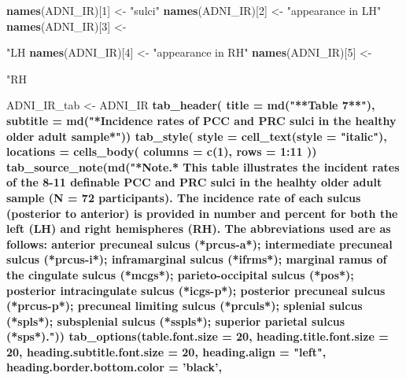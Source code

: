 \documentclass[
]{article}
\newenvironment{Shaded}{\begin{snugshade}}{\end{snugshade}}
\newcommand{\DataTypeTok}[1]{\textcolor[rgb]{0.13,0.29,0.53}{#1}}
\newcommand{\DecValTok}[1]{\textcolor[rgb]{0.00,0.00,0.81}{#1}}
\newcommand{\KeywordTok}[1]{\textcolor[rgb]{0.13,0.29,0.53}{\textbf{#1}}}
\newcommand{\NormalTok}[1]{#1}
\newcommand{\OperatorTok}[1]{\textcolor[rgb]{0.81,0.36,0.00}{\textbf{#1}}}
\newcommand{\StringTok}[1]{\textcolor[rgb]{0.31,0.60,0.02}{#1}}
\begin{document}
\begin{Shaded}
\begin{Highlighting}[]
{{\KeywordTok{names}\NormalTok{(ADNI_IR)[}\DecValTok{1}\NormalTok{] <-}\StringTok{ "sulci"}
\KeywordTok{names}\NormalTok{(ADNI_IR)[}\DecValTok{2}\NormalTok{] <-}\StringTok{ "appearance in LH"}
\KeywordTok{names}\NormalTok{(ADNI_IR)[}\DecValTok{3}\NormalTok{] <-}\StringTok{ "LH %"}
\KeywordTok{names}\NormalTok{(ADNI_IR)[}\DecValTok{4}\NormalTok{] <-}\StringTok{ "appearance in RH"}
\KeywordTok{names}\NormalTok{(ADNI_IR)[}\DecValTok{5}\NormalTok{] <-}\StringTok{ "RH %"}


\NormalTok{ADNI_IR_tab <-}\StringTok{ }\NormalTok{ADNI_IR }\OperatorTok{%>%}\StringTok{ }\KeywordTok{gt}\NormalTok{() }\OperatorTok{%>%}
\KeywordTok{tab_header}\NormalTok{(}
  \DataTypeTok{title =} \KeywordTok{md}\NormalTok{(}\StringTok{"**Table 7**"}\NormalTok{),}
  \DataTypeTok{subtitle =} \KeywordTok{md}\NormalTok{(}\StringTok{"*Incidence rates of PCC and PRC sulci in the healthy older adult sample*"}\NormalTok{)) }\OperatorTok{%>%}
\KeywordTok{tab_style}\NormalTok{(}
    \DataTypeTok{style =} \KeywordTok{cell_text}\NormalTok{(}\DataTypeTok{style =} \StringTok{"italic"}\NormalTok{),}
    \DataTypeTok{locations =} \KeywordTok{cells_body}\NormalTok{(}
      \DataTypeTok{columns =} \KeywordTok{c}\NormalTok{(}\DecValTok{1}\NormalTok{),}
      \DataTypeTok{rows =} \DecValTok{1}\OperatorTok{:}\DecValTok{11}
\NormalTok{    )) }\OperatorTok{%>%}
\KeywordTok{tab_source_note}\NormalTok{(}\KeywordTok{md}\NormalTok{(}\StringTok{"*Note.* This table illustrates the incident rates of the 8-11 definable PCC and PRC sulci in the healhty older adult sample (N = 72 participants). The incidence rate of each sulcus (posterior to anterior) is provided in number and percent for both the left (LH) and right hemispheres (RH). The abbreviations used are as follows: anterior precuneal sulcus (*prcus-a*); intermediate precuneal sulcus (*prcus-i*); inframarginal sulcus (*ifrms*); marginal ramus of the cingulate sulcus (*mcgs*); parieto-occipital sulcus (*pos*); posterior intracingulate sulcus (*icgs-p*); posterior precuneal sulcus (*prcus-p*); precuneal limiting sulcus (*prculs*); splenial sulcus (*spls*); subsplenial sulcus (*sspls*); superior parietal sulcus (*sps*)."}\NormalTok{)) }\OperatorTok{%>%}
\StringTok{  }\KeywordTok{tab_options}\NormalTok{(}\DataTypeTok{table.font.size =} \DecValTok{20}\NormalTok{,}
    \DataTypeTok{heading.title.font.size =} \DecValTok{20}\NormalTok{,}
    \DataTypeTok{heading.subtitle.font.size =} \DecValTok{20}\NormalTok{,}
    \DataTypeTok{heading.align =} \StringTok{"left"}\NormalTok{,}
    \DataTypeTok{heading.border.bottom.color =} \StringTok{'black'}\NormalTok{,}
}}}}}}}}
\end{Highlighting}
\end{Shaded}
\end{document}
